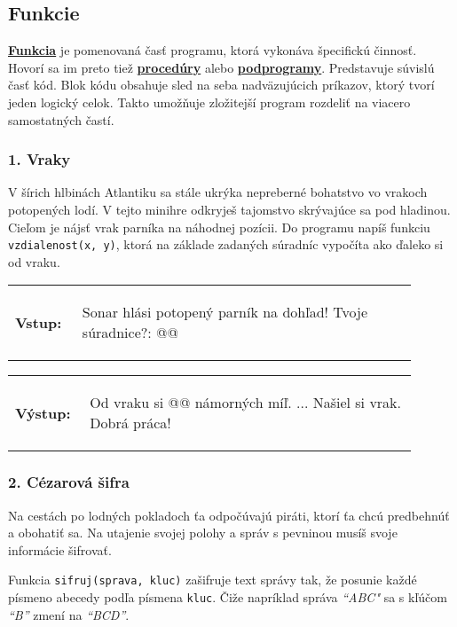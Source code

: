 \subsection{Funkcie}
\underline{\textbf{Funkcia}} je pomenovaná časť programu, ktorá vykonáva špecifickú činnosť. Hovorí sa im preto tiež \underline{\textbf{procedúry}} alebo \underline{\textbf{podprogramy}}. Predstavuje súvislú časť kód. Blok kódu obsahuje sled na seba nadväzujúcich príkazov, ktorý tvorí jeden logický celok. Takto umožňuje zložitejší program rozdeliť na viacero samostatných častí.

\subsubsection*{1. Vraky}
V šírich hlbinách Atlantiku sa stále ukrýka nepreberné bohatstvo vo vrakoch potopených lodí. V tejto minihre odkryješ tajomstvo skrývajúce sa pod hladinou. Cieľom je nájsť vrak parníka na náhodnej pozícii. Do programu napíš funkciu \verb|vzdialenost(x, y)|, ktorá na základe zadaných súradníc vypočíta ako ďaleko si od vraku.

\begin{tabular}{@{}p{0.15\linewidth}p{0.75\linewidth}}
\textbf{\small Vstup:} &
\vspace{-3em}
\begin{code}
Sonar hlási potopený parník na dohľad!
Tvoje súradnice?: @\fbox{\phantom{123}}@
\end{code}
\end{tabular}

\vspace{-2em}
\begin{tabular}{@{}p{0.15\linewidth}p{0.75\linewidth}}
\textbf{\small Výstup:} &
\vspace{-3em}
\begin{code}
Od vraku si @\fbox{\phantom{vstup}}@ námorných míľ.
...
Našiel si vrak. Dobrá práca!
\end{code}
\end{tabular}
\vspace{-2em}


\subsubsection*{2. Cézarová šifra}
Na cestách po lodných pokladoch ťa odpočúvajú piráti, ktorí ťa chcú predbehnúť a obohatiť sa. Na utajenie svojej polohy a správ s pevninou musíš svoje informácie šifrovať. 

Funkcia \verb|sifruj(sprava, kluc)| zašifruje text správy tak, že posunie každé písmeno abecedy podľa písmena \verb|kluc|. Čiže napríklad správa \emph{``ABC"} sa s kľúčom \emph{``B''} zmení na \emph{``BCD''}. 

